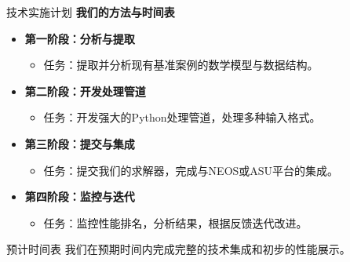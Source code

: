 \documentclass[10pt]{beamer}
\begin{document}
\begin{frame}[allowframebreaks]{技术实施计划}
  \textbf{我们的方法与时间表}
  \begin{itemize}
    \item \textbf{第一阶段：分析与提取}
      \begin{itemize}
        \item 任务：提取并分析现有基准案例的数学模型与数据结构。
      \end{itemize}
    \item \textbf{第二阶段：开发处理管道}
      \begin{itemize}
        \item 任务：开发强大的Python处理管道，处理多种输入格式。
      \end{itemize}
    \item \textbf{第三阶段：提交与集成}
      \begin{itemize}
        \item 任务：提交我们的求解器，完成与NEOS或ASU平台的集成。
      \end{itemize}
    \item \textbf{第四阶段：监控与迭代}
      \begin{itemize}
        \item 任务：监控性能排名，分析结果，根据反馈迭代改进。
      \end{itemize}
  \end{itemize}
  \begin{alertblock}{预计时间表}
    我们在预期时间内完成完整的技术集成和初步的性能展示。
  \end{alertblock}
\end{frame}
\end{document}
